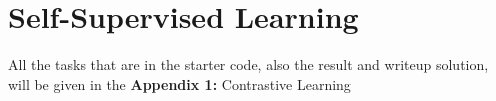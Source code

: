 \documentclass[a4paper, 10pt]{article}
\begin{document}
\subject[2110573 - Pattern Recognition]


\section{Self-Supervised Learning}


All the tasks that are in the starter code, also the result and writeup solution,
will be given in the \textbf{Appendix 1:} Contrastive Learning



\end{document}

